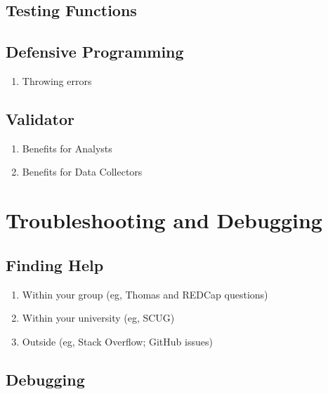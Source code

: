 \documentclass[
]{book}
\providecommand{\tightlist}{%
  \setlength{\itemsep}{0pt}\setlength{\parskip}{0pt}}
\begin{document}
\hypertarget{testing-functions}{%
\section{Testing Functions}\label{testing-functions}}

\hypertarget{defensive-programming}{%
\section{Defensive Programming}\label{defensive-programming}}

\begin{enumerate}
\def\labelenumi{\arabic{enumi}.}
\tightlist
\item
  Throwing errors
\end{enumerate}

\hypertarget{validator}{%
\section{Validator}\label{validator}}

\begin{enumerate}
\def\labelenumi{\arabic{enumi}.}
\tightlist
\item
  Benefits for Analysts
\item
  Benefits for Data Collectors
\end{enumerate}

\hypertarget{troubleshooting}{%
\chapter{Troubleshooting and Debugging}\label{troubleshooting}}

\hypertarget{finding-help}{%
\section{Finding Help}\label{finding-help}}

\begin{enumerate}
\def\labelenumi{\arabic{enumi}.}
\tightlist
\item
  Within your group (eg, Thomas and REDCap questions)
\item
  Within your university (eg, SCUG)
\item
  Outside (eg, Stack Overflow; GitHub issues)
\end{enumerate}

\hypertarget{debugging}{%
\section{Debugging}\label{debugging}}
\end{document}
